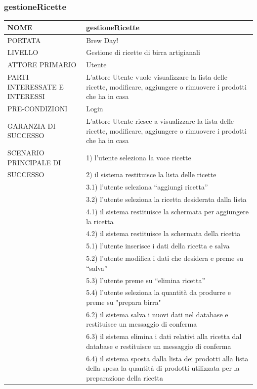 \documentclass[a4paper, titlepage]{article}
\begin{document}
\subsubsection{gestioneRicette}
\begin{longtable}{p{6cm}p{7cm}}\toprule
    NOME & gestioneRicette\\\midrule
    PORTATA & Brew Day!\\\midrule
    LIVELLO & Gestione di ricette di birra artigianali\\\midrule
    ATTORE PRIMARIO & Utente\\\midrule
    PARTI INTERESSATE E INTERESSI &
    L’attore Utente vuole visualizzare la lista delle ricette, modificare, aggiungere o rimuovere i prodotti che ha in casa \\\midrule
    PRE-CONDIZIONI & Login\\\midrule
    GARANZIA DI SUCCESSO & L’attore Utente riesce a visualizzare la lista delle ricette, modificare, aggiungere o rimuovere i prodotti che ha in casa \\\midrule
    SCENARIO PRINCIPALE DI
    & 1) l’utente seleziona la voce ricette\\
    SUCCESSO & 2) il sistema restituisce la lista delle ricette\\
    & 3.1) l’utente seleziona “aggiungi ricetta”\\
    & 3.2) l’utente seleziona la ricetta desiderata dalla lista\\
    & 4.1) il sistema restituisce la schermata per aggiungere la ricetta\\
    & 4.2) il sistema restituisce la schermata della ricetta\\
    & 5.1) l’utente inserisce i dati della ricetta e salva\\
    & 5.2) l’utente modifica i dati che desidera e preme su “salva”\\
    & 5.3) l’utente preme su “elimina ricetta”\\
    & 5.4) l'utente seleziona la quantità da produrre e preme su "prepara birra"\\
    & 6.2) il sistema salva i nuovi dati nel database e restituisce un messaggio di conferma\\
    & 6.3) il sistema elimina i dati relativi alla ricetta dal database e restituisce un messaggio di conferma\\
    & 6.4) il sistema sposta dalla lista dei prodotti alla lista della spesa la quantità di prodotti utilizzata per la preparazione della ricetta\\\midrule

\end{longtable}
\end{document}
